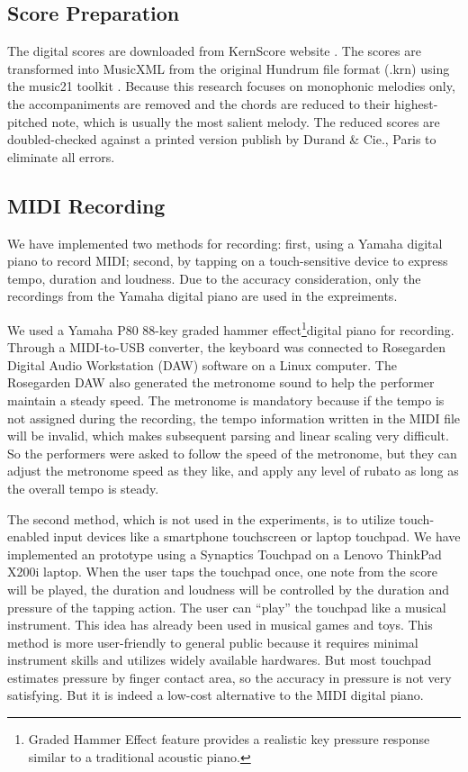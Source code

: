 \subsection{Score Preparation}

The digital scores are downloaded from KernScore website \cite{KernScores}. The  scores are transformed into MusicXML from the original Hundrum file format (.krn) using the  music21 toolkit \cite{music21}. Because this research focuses on monophonic melodies only, the accompaniments are removed and the chords are reduced to their highest-pitched note, which is usually the most salient melody. The reduced scores are doubled-checked against a printed version publish by Durand \& Cie., Paris \cite{Clementi1915} to eliminate all errors. %

\subsection{MIDI Recording}
We have implemented two methods for recording: first, using a Yamaha digital piano to record MIDI; second, by tapping on a touch-sensitive device to express tempo, duration and loudness. Due to the accuracy consideration, only the recordings from the Yamaha digital piano are used in the expreiments.


We used a Yamaha P80 88-key graded hammer effect\footnote{Graded Hammer Effect feature provides a realistic key pressure response similar to a traditional acoustic piano.}digital piano for recording. Through a MIDI-to-USB converter, the keyboard was connected to Rosegarden Digital Audio Workstation (DAW) software on a Linux computer. The Rosegarden DAW also generated the metronome sound to help the performer maintain a steady speed. The metronome is mandatory because if the tempo is not assigned during the recording, the tempo information written in the MIDI file will be invalid, which makes subsequent parsing and linear scaling very difficult. So the performers were asked to follow the speed of the metronome, but they can adjust the metronome speed as they like, and apply any level of rubato as long as the overall tempo is steady. 

The second method, which is not used in the experiments, is to utilize touch-enabled input devices like a smartphone touchscreen or laptop touchpad. We have implemented an prototype using a Synaptics Touchpad on a Lenovo ThinkPad X200i laptop. When the user taps the touchpad once, one note from the score will be played, the duration and loudness will be controlled by the duration and pressure of the tapping action. The user can \enquote{play} the touchpad like a musical instrument. This idea has already been used in musical games and toys. This method is more user-friendly to general public because it requires minimal instrument skills and utilizes widely available hardwares. But most touchpad estimates pressure by finger contact area, so the accuracy in pressure is not very satisfying. But it is indeed a low-cost alternative to the MIDI digital piano.

